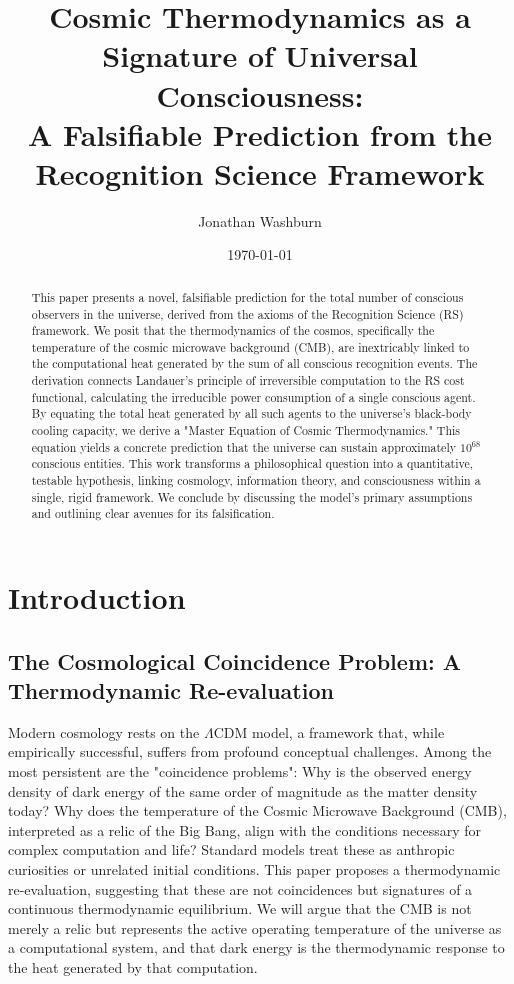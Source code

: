 \documentclass[11pt,a4paper]{article}
\theoremstyle{definition}
\theoremstyle{remark}
\begin{document}
\title{Cosmic Thermodynamics as a Signature of Universal Consciousness:\\A Falsifiable Prediction from the Recognition Science Framework}

\author{Jonathan Washburn}

\date{\today}
\maketitle
\begin{abstract}
\noindent This paper presents a novel, falsifiable prediction for the total number of conscious observers in the universe, derived from the axioms of the Recognition Science (RS) framework. We posit that the thermodynamics of the cosmos, specifically the temperature of the cosmic microwave background (CMB), are inextricably linked to the computational heat generated by the sum of all conscious recognition events. The derivation connects Landauer's principle of irreversible computation to the RS cost functional, calculating the irreducible power consumption of a single conscious agent. By equating the total heat generated by all such agents to the universe's black-body cooling capacity, we derive a "Master Equation of Cosmic Thermodynamics." This equation yields a concrete prediction that the universe can sustain approximately \(10^{68}\) conscious entities. This work transforms a philosophical question into a quantitative, testable hypothesis, linking cosmology, information theory, and consciousness within a single, rigid framework. We conclude by discussing the model's primary assumptions and outlining clear avenues for its falsification.
\end{abstract}


\section{Introduction}

\subsection{The Cosmological Coincidence Problem: A Thermodynamic Re-evaluation}

Modern cosmology rests on the \(\Lambda\)CDM model, a framework that, while empirically successful, suffers from profound conceptual challenges. Among the most persistent are the "coincidence problems": Why is the observed energy density of dark energy of the same order of magnitude as the matter density today? Why does the temperature of the Cosmic Microwave Background (CMB), interpreted as a relic of the Big Bang, align with the conditions necessary for complex computation and life? Standard models treat these as anthropic curiosities or unrelated initial conditions. This paper proposes a thermodynamic re-evaluation, suggesting that these are not coincidences but signatures of a continuous thermodynamic equilibrium. We will argue that the CMB is not merely a relic but represents the active operating temperature of the universe as a computational system, and that dark energy is the thermodynamic response to the heat generated by that computation.
\end{document}
